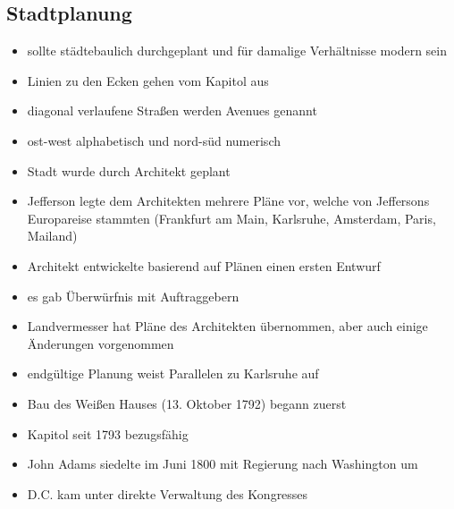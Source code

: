 \documentclass[10pt,a4paper,oneside,ngerman,numbers=noenddot]{scrartcl}
\newenvironment{myitemize}{\begin{itemize}\itemsep -8pt}{\end{itemize}} %
\begin{document}
\subsection*{Stadtplanung}
\begin{myitemize}
    \item sollte städtebaulich durchgeplant und für damalige Verhältnisse
          modern sein
    \item Linien zu den Ecken gehen vom Kapitol aus
    \item diagonal verlaufene Straßen werden Avenues genannt
    \item ost-west alphabetisch und nord-süd numerisch
    
    \item Stadt wurde durch Architekt geplant
    \item Jefferson legte dem Architekten mehrere Pläne vor, welche von Jeffersons Europareise stammten 
          (Frankfurt am Main, Karlsruhe, Amsterdam, Paris, Mailand) 
    \item Architekt entwickelte basierend auf Plänen einen ersten Entwurf
    \item es gab Überwürfnis mit Auftraggebern
    \item Landvermesser hat Pläne des Architekten übernommen, aber auch einige
          Änderungen vorgenommen
    \item endgültige Planung weist Parallelen zu Karlsruhe auf
    \item Bau des Weißen Hauses (13. Oktober 1792) begann zuerst
    \item Kapitol seit 1793 bezugsfähig
    \item John Adams siedelte im Juni 1800 mit Regierung nach Washington um
    \item D.C. kam unter direkte Verwaltung des Kongresses
\end{myitemize}
\end{document}

